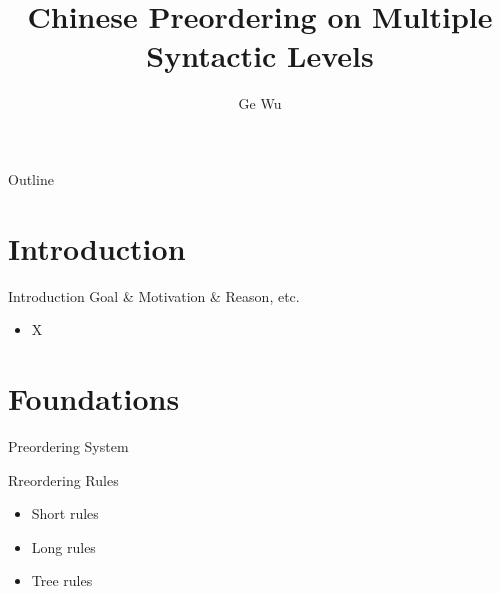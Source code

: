 \documentclass[18pt]{beamer}
\title{Chinese Preordering on Multiple Syntactic Levels}
\subtitle{}
\author{Ge Wu}
\institute{Institute for Anthropomatics and Robotics (IAR)}
\begin{document}

\begin{frame}
\titlepage
\end{frame}

\begin{frame}{Outline}
\tableofcontents
\end{frame}

\section{Introduction}
\begin{frame}{Introduction}
Goal \& Motivation \& Reason, etc.
\begin{itemize}
\item X
\end{itemize}
\end{frame}

\section{Foundations}

\begin{frame}{Preordering System}
\begin{figure}
\centering

\end{figure}
\end{frame}


\begin{frame}{Rreordering Rules}
\begin{itemize}
\item Short rules
\item Long rules
\item Tree rules
\end{itemize}
\end{frame}
\end{document}
